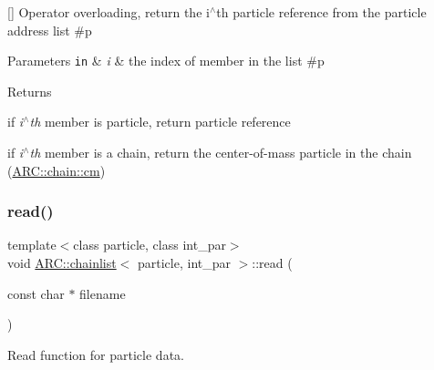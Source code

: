 \mbox{[}\mbox{]} Operator overloading, return the i$^\wedge$th particle reference from the particle address list \#p 
\begin{DoxyParams}[1]{Parameters}
\mbox{\tt in}  & {\em i} & the index of member in the list \#p \\
\hline
\end{DoxyParams}
\begin{DoxyReturn}{Returns}

\begin{DoxyItemize}
\item if {\itshape i$^\wedge$th} member is particle, return particle reference
\item if {\itshape i$^\wedge$th} member is a chain, return the center-\/of-\/mass particle in the chain (\hyperlink{classARC_1_1chain_a2eead75bd916fa7ffc05341645527847}{A\+R\+C\+::chain\+::cm}) 
\end{DoxyItemize}
\end{DoxyReturn}
\hypertarget{classARC_1_1chainlist_ad00d02518aa974cca1f82eec5d60afdd}{}\label{classARC_1_1chainlist_ad00d02518aa974cca1f82eec5d60afdd} 
\subsubsection{\texorpdfstring{read()}{read()}}
{\footnotesize\ttfamily template$<$class particle, class int\+\_\+par$>$ \\
void \hyperlink{classARC_1_1chainlist}{A\+R\+C\+::chainlist}$<$ particle, int\+\_\+par $>$\+::read (\begin{DoxyParamCaption}\item[{const char $\ast$}]{filename }\end{DoxyParamCaption})\hspace{0.3cm}{\ttfamily [inline]}}



Read function for particle data. 

